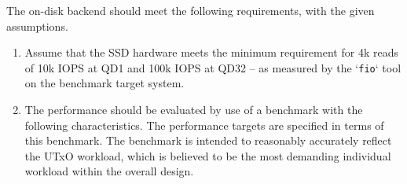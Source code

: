 \documentclass[11pt,a4paper]{article}
\begin{document}
The on-disk backend should meet the following requirements, with the given
assumptions.

\begin{enumerate}
\item Assume that the SSD hardware meets the minimum requirement for 4k reads
      of 10k IOPS at QD1 and 100k IOPS at QD32 -- as measured by the `{\tt fio}`
      tool on the benchmark target system.

\item The performance should be evaluated by use of a benchmark with the
      following characteristics. The performance targets are specified in terms
      of this benchmark. The benchmark is intended to reasonably accurately
      reflect the UTxO workload, which is believed to be the most demanding
      individual workload within the overall design.


\end{enumerate}
\end{document}
